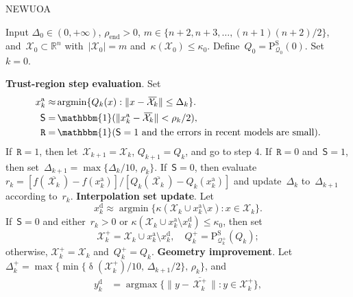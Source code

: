 \documentclass[11pt,a4paper,draft]{article}  %
\theoremstyle{definition}
\numberwithin{equation}{section}
\newcommand{\mbar}[1]{\,\overline{\!{#1}\!}\,} %
\newcommand{\xopt}{\mbar}
\DeclareMathOperator{\xdist}{\updelta}
\DeclareMathOperator*{\argmax}{argmax}
\DeclareMathOperator*{\argmin}{argmin}
\DeclareMathOperator{\ind}{\mathbbm{1}}
\newcommand{\shortd}{\mathsf{S}}
\newcommand{\redrho}{\mathtt{R}}
\newcommand{\RR}{\mathbb{R}}
\newcommand{\Int}{\mathcal{X}}
\newcommand{\Qua}{\mathcal{Q}}
\newcommand{\sss}[1]{{\scriptscriptstyle{#1}}}
\newcommand{\add}{{\textrm{a}}}
\newcommand{\drop}{{\textrm{d}}}
\newcommand{\new}{{\sss{+}}}
\newcommand{\fin}{{\textrm{end}}}
\newcommand{\sob}{{\scriptscriptstyle{\textrm{S}}}}
\newcommand{\Projs}{\mathrm{P}^\sob}
\begin{document}
\begin{algorithm}[htbp!]
    \caption{\label{alg:newuoa}NEWUOA}
    Input $\Delta_0\in (0,+\infty)$, $\rho_{\fin}>0$, $m\in \{n+2, n+3, \dots, (n+1)(n+2)/2\}$,
    and~$\Int_0\subset \RR^n$ with~$|\Int_0|=m$ and~$\kappa(\Int_0) \le \kappa_0$.
    Define~$Q_0 = \Projs_{\Qua_0}(0)$.
    Set~$k=0$.
    \begin{algorithmic}[1]
        \State \textbf{Trust-region step evaluation}.
        Set
        \begin{align}
             \label{eq:xaddn}
             x_k^\add \approx &\argmin\{Q_k(x)\mathrel{:} \|x-\xopt{\Int_k}\|\le \Delta_k\}.\\
            \label{eq:shortd}
            \shortd = &\ind(\|x_k^\add-\xopt{\Int_k}\| < \rho_k/2),\\
            \label{eq:redrho}
            \redrho = & \ind(\shortd=1\text{ and the errors in recent models are small}).
        \end{align}
        If~$\redrho = 1$, then let~$\Int_{k+1} = \Int_k$, $Q_{k+1} = Q_k$, and go to step 4.
        If~$\redrho = 0$ and~$\shortd = 1$, then set~$\Delta_{k+1} = \max\{\Delta_k/10,\, \rho_k\}$.
        If~$\shortd = 0$, then evaluate $r_k = [f(\xopt{\Int_k})-f(x_k^\add)]/[Q_k(\xopt{\Int_k})-Q_k(x_k^\add)]$ and update~$\Delta_k$ to~$\Delta_{k+1}$ according to~$r_k$.
        \State \textbf{Interpolation set update}.
        Let
        \begin{equation}
            \label{eq:xdropn}
            x_k^\drop \approx \argmin\{\kappa(\Int_k\cup x_k^\add\setminus x) \mathrel{:} x \in
            \Int_k\}.
        \end{equation}
        If~$\shortd = 0$ and either~$r_k>0$ or $\kappa(\Int_k\cup x_k^\add \setminus x_k^\drop) \le
        \kappa_0$, then set
        \begin{equation}
            \label{eq:updateq1}
            \Int^{\new}_{k} = \Int_k\cup x_k^\add\setminus x_k^\drop, \quad
            {Q}^{\new}_k = \Projs_{\Qua_k^\new}(Q_k);
        \end{equation}
        otherwise, $\Int_k^\new = \Int_k$ and~$Q_k^\new =Q_k$.
        \State \textbf{Geometry improvement}.
        Let~$\Delta^{\new}_k = \max\{\min\{\xdist(\Int_k^\new)/10,\, \Delta_{k+1}/2\},\,\rho_{k}\}$,
        and
          \begin{align}
              \label{eq:ydropn}
              y_k^\drop &= \argmax\{\|y-\xopt{\Int^{\new}_k}\| \mathrel{:} y \in \Int^{\new}_k\},\\

\end{align}
\end{algorithmic}
\end{algorithm}
\end{document}
